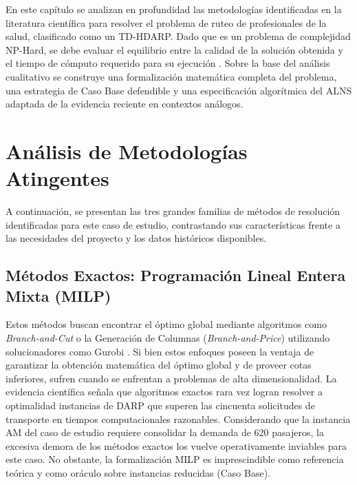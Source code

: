 En este capítulo se analizan en profundidad las metodologías identificadas en la literatura científica para resolver el problema de ruteo de profesionales de la salud, clasificado como un TD-HDARP. Dado que es un problema de complejidad NP-Hard, se debe evaluar el equilibrio entre la calidad de la solución obtenida y el tiempo de cómputo requerido para su ejecución \cite{Cordeau2003}. Sobre la base del análisis cualitativo se construye una formalización matemática completa del problema, una estrategia de Caso Base defendible y una especificación algorítmica del ALNS adaptada de la evidencia reciente en contextos análogos.

\section{Análisis de Metodologías Atingentes}

A continuación, se presentan las tres grandes familias de métodos de resolución identificadas para este caso de estudio, contrastando sus características frente a las necesidades del proyecto y los datos históricos disponibles.

\subsection{Métodos Exactos: Programación Lineal Entera Mixta (MILP)}
Estos métodos buscan encontrar el óptimo global mediante algoritmos como \textit{Branch-and-Cut} o la Generación de Columnas (\textit{Branch-and-Price}) utilizando solucionadores como Gurobi \cite{Cordeau2006}. Si bien estos enfoques poseen la ventaja de garantizar la obtención matemática del óptimo global y de proveer cotas inferiores, sufren cuando se enfrentan a problemas de alta dimensionalidad. La evidencia científica señala que algoritmos exactos rara vez logran resolver a optimalidad instancias de DARP que superen las cincuenta solicitudes de transporte en tiempos computacionales razonables. Considerando que la instancia AM del caso de estudio requiere consolidar la demanda de 620 pasajeros, la excesiva demora de los métodos exactos los vuelve operativamente inviables para este caso. No obstante, la formalización MILP es imprescindible como referencia teórica y como oráculo sobre instancias reducidas (Caso Base).

